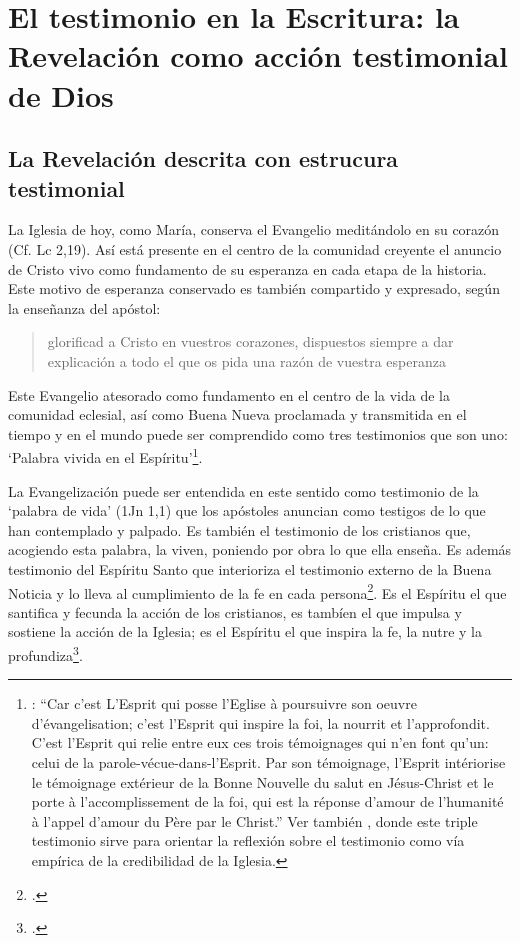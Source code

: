 \section{El testimonio en la Escritura: la Revelación como acción testimonial de Dios}

\subsection{La Revelación descrita con estrucura testimonial}

La Iglesia de hoy, como María, conserva el Evangelio meditándolo en su corazón (Cf. Lc 2,19). Así está presente en el centro de la comunidad creyente el anuncio de Cristo vivo como fundamento de su esperanza en cada etapa de la historia. Este motivo de esperanza conservado es también compartido y expresado, según la enseñanza del apóstol: \blockquote[][\,(1Pe 3,15)]{glorificad a Cristo en vuestros corazones, dispuestos siempre a dar explicación a todo el que os pida una razón de vuestra esperanza}.

Este Evangelio atesorado como fundamento en el centro de la vida de la comunidad eclesial, así como Buena Nueva proclamada y transmitida en el tiempo y en el mundo puede ser comprendido como tres testimonios que son uno: \enquote*{Palabra vivida en el Espíritu}\footnote{\Cite[Cf.][110]{latourelle1975et}: \enquote{Car c'est L'Esprit qui posse l'Eglise à poursuivre son oeuvre d'évangelisation; c'est l'Esprit qui inspire la foi, la nourrit et l'approfondit. C'est l'Esprit qui relie entre eux ces trois témoignages qui n'en font qu'un: celui de la parole-vécue-dans-l'Esprit. Par son témoignage, l'Esprit intériorise le témoignage extérieur de la Bonne Nouvelle du salut en Jésus-Christ et le porte à l'accomplissement de la foi, qui est la réponse d'amour de l'humanité à l'appel d'amour du Père par le Christ.} Ver también \Cite[582]{ninot2009tf}, donde este triple testimonio sirve para orientar la reflexión sobre el testimonio como vía empírica de la credibilidad de la Iglesia.}.

La Evangelización puede ser entendida en este sentido como testimonio de la `palabra de vida' (1Jn 1,1) que los apóstoles anuncian como testigos de lo que han contemplado y palpado. Es también el testimonio de los cristianos que, acogiendo esta palabra, la viven, poniendo por obra lo que ella enseña. Es además testimonio del Espíritu Santo que interioriza el testimonio externo de la Buena Noticia y lo lleva al cumplimiento de la fe en cada persona\footcite[Cf.][110]{latourelle1975et}. Es el Espíritu el que santifica y fecunda la acción de los cristianos, es tambíen el que impulsa y sostiene la acción de la Iglesia; es el Espíritu el que inspira la fe, la nutre y la profundiza\footcite[Cf.][110]{latourelle1975et}.

